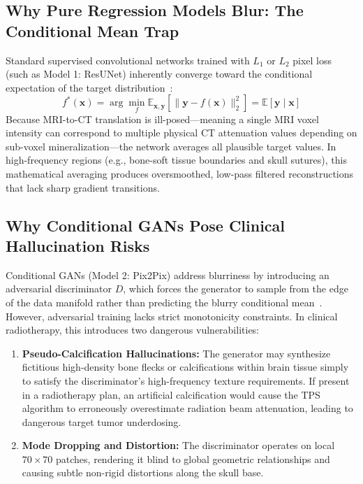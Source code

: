 \subsection{Why Pure Regression Models Blur: The Conditional Mean Trap}
Standard supervised convolutional networks trained with $L_1$ or $L_2$ pixel loss (such as Model 1: ResUNet) inherently converge toward the conditional expectation of the target distribution~\cite{nie2017medical,zhang2018road}:
\begin{equation}
f^*(\mathbf{x}) = \arg\min_f \mathbb{E}_{\mathbf{x}, \mathbf{y}}\left[ \|\mathbf{y} - f(\mathbf{x})\|_2^2 \right] = \mathbb{E}[\mathbf{y} \mid \mathbf{x}]
\label{eq:conditional_expectation}
\end{equation}
Because MRI-to-CT translation is ill-posed---meaning a single MRI voxel intensity can correspond to multiple physical CT attenuation values depending on sub-voxel mineralization---the network averages all plausible target values. In high-frequency regions (e.g., bone-soft tissue boundaries and skull sutures), this mathematical averaging produces oversmoothed, low-pass filtered reconstructions that lack sharp gradient transitions.

\subsection{Why Conditional GANs Pose Clinical Hallucination Risks}
Conditional GANs (Model 2: Pix2Pix) address blurriness by introducing an adversarial discriminator $D$, which forces the generator to sample from the edge of the data manifold rather than predicting the blurry conditional mean~\cite{isola2017image}. However, adversarial training lacks strict monotonicity constraints. In clinical radiotherapy, this introduces two dangerous vulnerabilities:
\begin{enumerate}
    \item \textbf{Pseudo-Calcification Hallucinations:} The generator may synthesize fictitious high-density bone flecks or calcifications within brain tissue simply to satisfy the discriminator's high-frequency texture requirements. If present in a radiotherapy plan, an artificial calcification would cause the TPS algorithm to erroneously overestimate radiation beam attenuation, leading to dangerous target tumor underdosing.
    \item \textbf{Mode Dropping and Distortion:} The discriminator operates on local $70 \times 70$ patches, rendering it blind to global geometric relationships and causing subtle non-rigid distortions along the skull base.
\end{enumerate}

